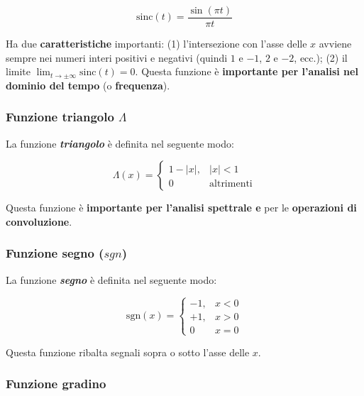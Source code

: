 \documentclass[a4paper]{article}
\begin{document}
	\begin{equation*}
		\mathrm{sinc}(t) = \dfrac{\sin{\left(\pi t\right)}}{\pi t}
	\end{equation*}

	\noindent
	Ha due \textbf{caratteristiche} importanti: (1) l'intersezione con l'asse delle $x$ avviene sempre nei numeri interi positivi e negativi (quindi $1$ e $-1$, $2$ e $-2$, ecc.); (2) il limite $\displaystyle \lim_{t\rightarrow \pm\infty}\mathrm{sinc}(t) = 0$.\newline
	Questa funzione è \textbf{importante per l'analisi nel dominio del tempo} (o \textbf{frequenza}).
	
	\subsubsection{Funzione triangolo $\Lambda$}
	
	La funzione \textbf{\emph{triangolo}} è definita nel seguente modo:
	
	\begin{equation*}
		\Lambda(x) =
		\begin{cases}
			1-|x|, 	& |x| < 1 \\
			0		& \text{altrimenti}
		\end{cases}
	\end{equation*}

	\noindent
	Questa funzione è \textbf{importante per l'analisi spettrale e} per le \textbf{operazioni di convoluzione}.
	
	\subsubsection{Funzione segno ($sgn$)}
	
	La funzione \textbf{\emph{segno}} è definita nel seguente modo:
	
	\begin{equation*}
		\mathrm{sgn}(x) =
		\begin{cases}
			-1, 	& x < 0 \\
			+1,		& x > 0 \\
			0		& x = 0
		\end{cases}
	\end{equation*}
	
	\noindent
	Questa funzione ribalta segnali sopra o sotto l'asse delle $x$.
	
	\subsubsection{Funzione gradino}
	
\end{document}
